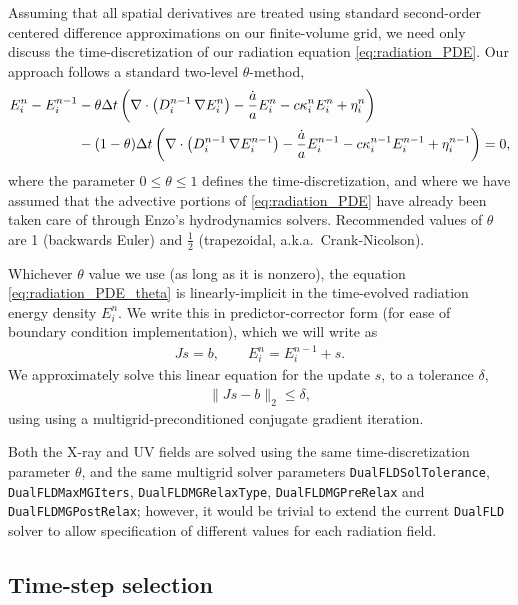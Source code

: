 \documentclass[letterpaper,10pt]{article}
\renewcommand{\(}{\left(}
\renewcommand{\)}{\right)}
\newcommand{\dt}{\Delta t}
\begin{document}
Assuming that all spatial derivatives are treated using standard
second-order centered difference approximations on our finite-volume
grid, we need only discuss the time-discretization of our radiation
equation \eqref{eq:radiation_PDE}.  Our approach follows a standard
two-level $\theta$-method, 
\begin{align}
  \label{eq:radiation_PDE_theta}
  E_i^n - E_i^{n-1} &- \theta\dt\left(\nabla\cdot\(D_i^{n-1}\,\nabla E_i^n\)
    - \frac{\dot{a}}{a} E_i^n - c\kappa_i^n E_i^n + \eta_i^n\right) \\ 
  \notag
  & - (1-\theta)\dt\left(\nabla\cdot\(D_i^{n-1}\,\nabla E_i^{n-1}\) -
    \frac{\dot{a}}{a} E_i^{n-1} - c\kappa_i^{n-1} E_i^{n-1} +
    \eta_i^{n-1}\right) = 0, 
\end{align}
where the parameter $0\le\theta\le 1$ defines the time-discretization,
and where we have assumed that the advective portions of \eqref{eq:radiation_PDE}
have already been taken care of through Enzo's hydrodynamics solvers.
Recommended values of $\theta$ are 1 (backwards Euler) and $\frac12$
(trapezoidal, a.k.a.~Crank-Nicolson).  

Whichever $\theta$ value we use (as long as it is nonzero), the
equation \eqref{eq:radiation_PDE_theta} is linearly-implicit in the
time-evolved radiation energy density $E_i^n$.  We write this in
predictor-corrector form (for ease of boundary condition
implementation), which we will write as
\begin{align}
\label{eq:linear_system}
  J s = b, \qquad E_i^n = E_i^{n-1} + s.
\end{align}
We approximately solve this linear equation for the update $s$,
to a tolerance $\delta$,
\begin{align}
\label{eq:linear_system_approx}
  \| J s - b \|_2 \le \delta,
\end{align}
using using a multigrid-preconditioned conjugate gradient iteration.  

Both the X-ray and UV fields are solved using the same
time-discretization parameter $\theta$, and the same multigrid solver
parameters {\tt DualFLDSolTolerance}, {\tt DualFLDMaxMGIters}, 
{\tt DualFLDMGRelaxType}, {\tt DualFLDMGPreRelax} and 
{\tt DualFLDMGPostRelax}; however, it would be trivial to extend the
current {\tt DualFLD} solver to allow specification of different
values for each radiation field.





\subsection{Time-step selection}
\label{sec:dt_selection}
\end{document}
